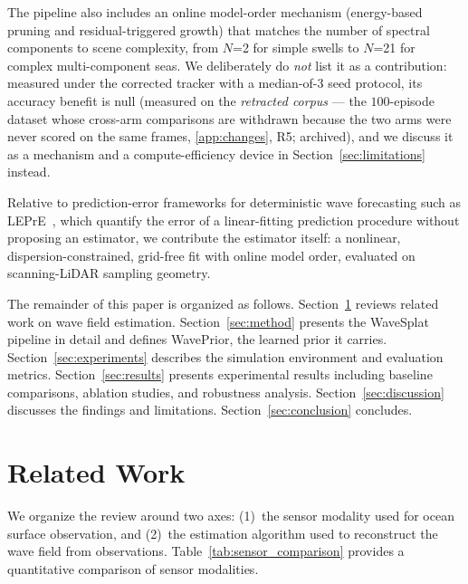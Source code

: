 \documentclass[review]{elsarticle}
\begin{document}
The pipeline also includes an online model-order mechanism (energy-based
pruning and residual-triggered growth) that
matches the number of spectral components to scene complexity, from $N$=2 for
simple swells to $N$=21 for complex multi-component seas.  We deliberately do
\emph{not} list it as a contribution: measured under the corrected tracker with
a median-of-3 seed protocol, its accuracy benefit is null
(measured on the \emph{retracted corpus} --- the $100$-episode dataset whose
cross-arm comparisons are withdrawn because the two arms were never scored on the
same frames, \ref{app:changes}, R5; archived), and we discuss it as a mechanism and a
compute-efficiency device in Section~\ref{sec:limitations} instead.

Relative to prediction-error frameworks for deterministic wave forecasting such
as LEPrE~\citep{fucile2018}, which quantify the error of a linear-fitting
prediction procedure without proposing an estimator, we contribute the estimator
itself: a nonlinear, dispersion-constrained, grid-free fit with online model
order, evaluated on scanning-LiDAR sampling geometry.

The remainder of this paper is organized as follows.
Section~\ref{sec:related} reviews related work on wave field estimation.
Section~\ref{sec:method} presents the WaveSplat pipeline in detail and defines
WavePrior, the learned prior it carries.
Section~\ref{sec:experiments} describes the simulation environment and
evaluation metrics.
Section~\ref{sec:results} presents experimental results including
baseline comparisons, ablation studies, and robustness analysis.
Section~\ref{sec:discussion} discusses the findings and limitations.
Section~\ref{sec:conclusion} concludes.

\section{Related Work}
\label{sec:related}

We organize the review around two axes: (1)~the sensor modality
used for ocean surface observation, and (2)~the estimation algorithm
used to reconstruct the wave field from observations.
Table~\ref{tab:sensor_comparison} provides a quantitative comparison
of sensor modalities.
\end{document}
